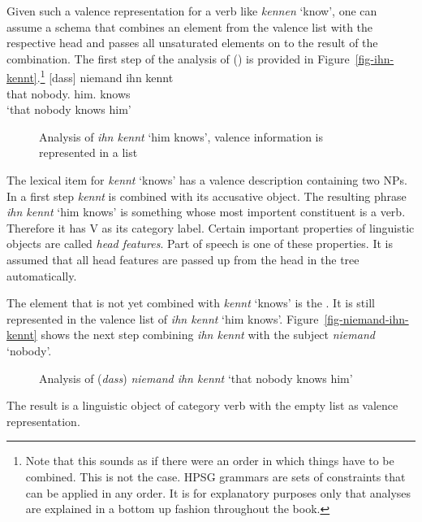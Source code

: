 Given such a valence representation for a verb like \emph{kennen} `know', one can assume a schema
that combines an element from the valence list with the respective head and passes all unsaturated
elements on to the result of the combination. The first step of the analysis of () is
provided in Figure~\vref{fig-ihn-kennt}.\footnote{%
  Note that this sounds as if there were an order in which things have to be combined. This is not
  the case. HPSG grammars are sets of constraints that can be applied in any order. It is for
  explanatory purposes only that analyses are explained in a bottom up fashion throughout the book.%
}
\ea
\label{ex-dass-niemand-ihn-kennt}
\gll  {}[dass] niemand ihn kennt\\
      \spacebr{}that nobody.\NOM{} him.\ACC{} knows\\ 
\glt `that nobody knows him'
\z
\begin{figure}
\centerfit{%
\begin{forest}
sm edges
[{V \sliste{ NP[\type{nom}] } }
  [{NP[\type{acc}]} [ihn;him] ]
  [{V \sliste{ NP[\type{nom}], NP[\type{acc}] }} [kennt;knows]] ] ]
\end{forest}}
\caption{\label{fig-ihn-kennt}Analysis of \emph{ihn kennt} `him knows', valence information is represented in a list}
\end{figure}
The lexical item for \emph{kennt} `knows' has a valence description containing two NPs. In a first
step \emph{kennt} is combined with its accusative object. The resulting phrase \emph{ihn kennt} `him
knows' is something whose most importent constituent is a verb. Therefore it has V as its category
label. Certain important properties of linguistic objects are called \emph{head features}. Part of speech
is one of these properties. It is assumed that all head features are passed up from the head in the tree
automatically.

The element that is not yet combined with \emph{kennt} `knows' is the \npnom. It is still
represented in the valence list of \emph{ihn kennt} `him knows'. Figure~\vref{fig-niemand-ihn-kennt}
shows the next step combining \emph{ihn kennt} with the subject \emph{niemand} `nobody'.
\begin{figure}
\caption{\label{fig-niemand-ihn-kennt}Analysis of (\emph{dass}) \emph{niemand ihn kennt} `that nobody
  knows him'}
\end{figure}
The result is a linguistic object of category verb with the empty list as valence representation.

